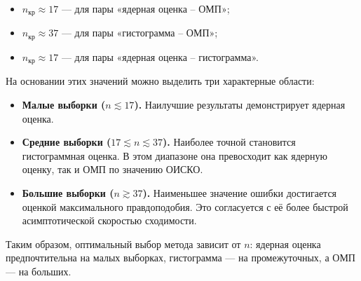 \documentclass[12pt,a4paper]{article}
\begin{document}
\begin{itemize}
    \item \(n_{\text{кр}} \approx 17\) — для пары «ядерная оценка -- ОМП»;
    \item \(n_{\text{кр}} \approx 37\) — для пары «гистограмма -- ОМП»;
    \item \(n_{\text{кр}} \approx 17\) — для пары «ядерная оценка -- гистограмма».
\end{itemize}

На основании этих значений можно выделить три характерные области:

\begin{itemize}
    \item \textbf{Малые выборки (\(n \lesssim 17\)).}  
    Наилучшие результаты демонстрирует ядерная оценка.

    \item \textbf{Средние выборки (\(17 \lesssim n \lesssim 37\)).}  
    Наиболее точной становится гистограммная оценка. В этом диапазоне она превосходит как ядерную оценку, так и ОМП по значению ОИСКО.

    \item \textbf{Большие выборки (\(n \gtrsim 37\)).}  
    Наименьшее значение ошибки достигается оценкой максимального правдоподобия. Это согласуется с её более быстрой асимптотической скоростью сходимости.
\end{itemize}

Таким образом, оптимальный выбор метода зависит от \(n\): 
ядерная оценка предпочтительна на малых выборках, гистограмма — на промежуточных, 
а ОМП — на больших.
\end{document}
